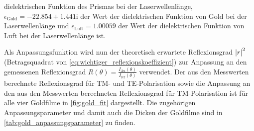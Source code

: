 dielektrischen Funktion des Prismas bei der Laserwellenlänge, $\epsilon_{\mathrm{Gold}} = -\num{22,854} + \num{1,441} \mathrm{i}$ der Wert der dielektrischen Funktion von Gold \cite{dielec_gold} bei der Laserwellenlänge und
$\epsilon_{\mathrm{Luft}} = \num{1,00059}$ der Wert der dielektrischen Funktion von Luft \cite{wiki:permittivität} bei der Laserwellenlänge ist.\par
Als Anpassungsfunktion wird nun der theoretisch erwartete Reflexionsgrad $\abs{r}^2$ (Betragsquadrat von \cref{eq:wichtiger_reflexionskoeffizient}) zur Anpassung an den
gemessenen Reflexionsgrad $R(\theta) = \frac{I_{\mathrm{Au}}(\theta)}{I_{\mathrm{ref}}(\theta)}$ verwendet. Der aus den Messwerten berechnete
Reflexionsgrad für TM- und TE-Polarisation sowie die Anpassung an den aus den Messwerten berechneten Reflexionsgrad für TM-Polarisation ist für alle vier Goldfilme
in \cref{fig:gold_fit} dargestellt. Die zugehörigen Anpassungsparameter und damit auch die Dicken der Goldfilme sind in \cref{tab:gold_anpassungsparameter} zu finden.
